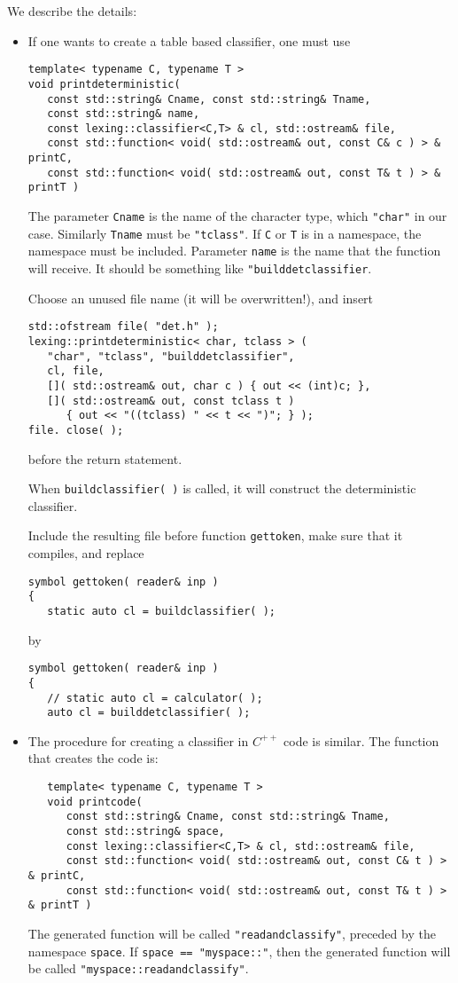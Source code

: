 \documentclass{article}
\begin{document}
\noindent
We describe the details: 
\begin{itemize}
\item
   If one wants to create a table based classifier,
   one must use 
\begin{verbatim}
template< typename C, typename T > 
void printdeterministic(
   const std::string& Cname, const std::string& Tname,
   const std::string& name,
   const lexing::classifier<C,T> & cl, std::ostream& file,
   const std::function< void( std::ostream& out, const C& c ) > & printC,
   const std::function< void( std::ostream& out, const T& t ) > & printT ) \end{verbatim}
The parameter \verb+Cname+ is the name of the character type,
which \verb+"char"+ in our case. Similarly
\verb+Tname+ must be \verb+"tclass"+. If \verb+C+ or
\verb+T+ is in a namespace, the namespace must be included.
Parameter \verb+name+ is the name that the function will receive.
It should be something like \verb+"builddetclassifier+.

Choose an unused file name (it will be overwritten!), 
and insert
\begin{verbatim}
std::ofstream file( "det.h" );
lexing::printdeterministic< char, tclass > (
   "char", "tclass", "builddetclassifier",
   cl, file,
   []( std::ostream& out, char c ) { out << (int)c; },
   []( std::ostream& out, const tclass t ) 
      { out << "((tclass) " << t << ")"; } );
file. close( ); 
\end{verbatim}
before the return statement. 

When \verb+buildclassifier( )+ is called, it will construct
the deterministic classifier. 

Include the resulting file before function
\verb+gettoken+, make sure that it compiles,
and replace
\begin{verbatim}
symbol gettoken( reader& inp )
{
   static auto cl = buildclassifier( );
\end{verbatim}
by
\begin{verbatim}
symbol gettoken( reader& inp )
{
   // static auto cl = calculator( );
   auto cl = builddetclassifier( ); \end{verbatim} 

\item
   The procedure for creating a classifier
   in $ C^{++} $ code is similar.
   The function that creates the code is:
   \begin{verbatim}
   template< typename C, typename T >
   void printcode(
      const std::string& Cname, const std::string& Tname,
      const std::string& space,
      const lexing::classifier<C,T> & cl, std::ostream& file,
      const std::function< void( std::ostream& out, const C& t ) > & printC,
      const std::function< void( std::ostream& out, const T& t ) > & printT ) \end{verbatim}
The generated function will be called \verb+"readandclassify"+, 
preceded by the namespace \verb+space+.
If \verb+space == "myspace::"+, then the generated
function will be called 
\verb|"myspace::readandclassify"|. 


\end{itemize}
\end{document}

